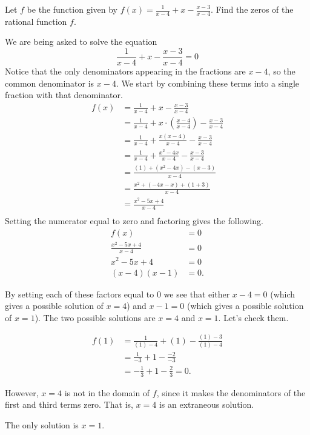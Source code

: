 \documentclass[nooutcomes]{ximera}
\begin{document}
	\begin{example}

		Let $f$ be the function given by $f(x) =  \frac{1}{x-4} + x -\frac{x-3}{x-4}$. Find the zeros of the rational function $f$.
	
		\begin{explanation} 

			We are being asked to solve the equation $$ \frac{1}{x-4} + x -\frac{x-3}{x-4} =0 $$
			Notice that the only denominators appearing in the fractions are $x-4$, so the common denominator is $x-4$. We start by combining 
			these terms into a single fraction with that denominator.
			\begin{align*}
				f(x) & =  \frac{1}{x-4} + x -\frac{x-3}{x-4} \\
					& =  \frac{1}{x-4} + x\cdot\left(\frac{x-4}{x-4}\right) -\frac{x-3}{x-4} \\
					& =  \frac{1}{x-4} + \frac{x(x-4)}{x-4} -\frac{x-3}{x-4} \\
					& =  \frac{1}{x-4} + \frac{x^2-4x}{x-4} -\frac{x-3}{x-4} \\
					& =  \frac{(1)+(x^2-4x)-(x-3)}{x-4}\\	
					& =  \frac{x^2 + (-4x-x) + (1+3)}{x-4}\\	
					& =  \frac{x^2 - 5x + 4}{x-4}\\	
			\end{align*}			
			Setting the numerator equal to zero and factoring gives the following.
			\begin{align*}
				f(x) & = 0 \\
				\frac{x^2 - 5x + 4}{x-4} &= 0\\	
				x^2-5x+4 &= 0\\
				(x-4)(x-1) &= 0.
			\end{align*}

			By setting each of these factors equal to $0$ we see that either $x-4=0$ (which gives a possible solution of $x=4$) and 
			$x-1=0$ (which gives a possible solution of $x=1$). The two possible solutions are $x=4$ and $x=1$. Let's check them.
			
			\begin{align*}
				f(1) &= \frac{1}{(1)-4} + (1) -\frac{(1)-3}{(1)-4}	\\
					&= \frac{1}{-3} + 1 - \frac{-2}{-3}\\
					&= -\frac{1}{3} + 1 - \frac{2}{3} = 0.
			\end{align*}
			
			However, $x=4$ is not in the domain of $f$, since it makes the denominators of the first and third terms zero. That is, $x=4$ 
			is an extraneous solution.
			
			The only solution is $x=1$.
		\end{explanation}
	\end{example}
	
\end{document}
